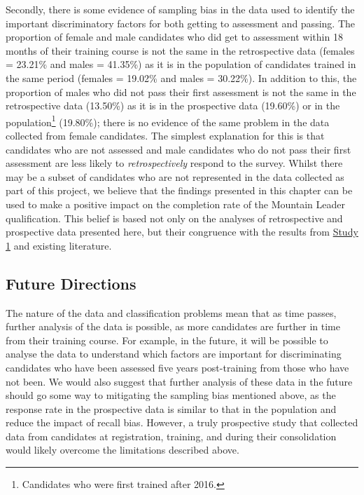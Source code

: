 \documentclass[
  12pt,
  a4paper,
]{book}
\begin{document}
Secondly, there is some evidence of sampling bias in the data used to identify the important discriminatory factors for both getting to assessment and passing. The proportion of female and male candidates who did get to assessment within 18 months of their training course is not the same in the retrospective data (females = 23.21\% and males = 41.35\%) as it is in the population of candidates trained in the same period (females = 19.02\% and males = 30.22\%). In addition to this, the proportion of males who did not pass their first assessment is not the same in the retrospective data (13.50\%) as it is in the prospective data (19.60\%) or in the population\footnote{Candidates who were first trained after 2016.} (19.80\%); there is no evidence of the same problem in the data collected from female candidates. The simplest explanation for this is that candidates who are not assessed and male candidates who do not pass their first assessment are less likely to \emph{retrospectively} respond to the survey. Whilst there may be a subset of candidates who are not represented in the data collected as part of this project, we believe that the findings presented in this chapter can be used to make a positive impact on the completion rate of the Mountain Leader qualification. This belief is based not only on the analyses of retrospective and prospective data presented here, but their congruence with the results from \protect\hyperlink{ml-qualitative}{Study 1} and existing literature.

\hypertarget{ml-pra-future-directions}{%
\subsection{Future Directions}\label{ml-pra-future-directions}}

The nature of the data and classification problems mean that as time passes, further analysis of the data is possible, as more candidates are further in time from their training course. For example, in the future, it will be possible to analyse the data to understand which factors are important for discriminating candidates who have been assessed five years post-training from those who have not been. We would also suggest that further analysis of these data in the future should go some way to mitigating the sampling bias mentioned above, as the response rate in the prospective data is similar to that in the population and reduce the impact of recall bias. However, a truly prospective study that collected data from candidates at registration, training, and during their consolidation would likely overcome the limitations described above.
\end{document}
